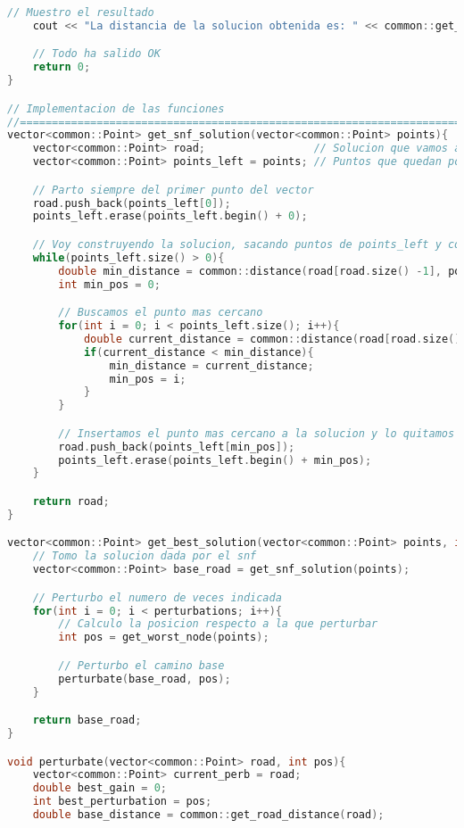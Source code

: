 \documentclass[10pt, a4paper]{article}
\theoremstyle{theorem-style}
\theoremstyle{theorem-style}
\theoremstyle{definition-style}
\theoremstyle{remark-style}
\theoremstyle{example-style}
\theoremstyle{definition-style}
\theoremstyle{remark-style}
\begin{document}
\begin{lstlisting}[language=C]
    // Muestro el resultado
    cout << "La distancia de la solucion obtenida es: " << common::get_road_distance(road) << endl;

    // Todo ha salido OK
    return 0;
}

// Implementacion de las funciones 
//==============================================================================
vector<common::Point> get_snf_solution(vector<common::Point> points){
    vector<common::Point> road;                 // Solucion que vamos a construir
    vector<common::Point> points_left = points; // Puntos que quedan por insertar a la solucion

    // Parto siempre del primer punto del vector
    road.push_back(points_left[0]);
    points_left.erase(points_left.begin() + 0);

    // Voy construyendo la solucion, sacando puntos de points_left y colocandolos en road
    while(points_left.size() > 0){
        double min_distance = common::distance(road[road.size() -1], points_left[0]);
        int min_pos = 0;

        // Buscamos el punto mas cercano
        for(int i = 0; i < points_left.size(); i++){
            double current_distance = common::distance(road[road.size() -1], points_left[i]);
            if(current_distance < min_distance){
                min_distance = current_distance;
                min_pos = i;
            }
        }

        // Insertamos el punto mas cercano a la solucion y lo quitamos de los puntos que faltan
        road.push_back(points_left[min_pos]);
        points_left.erase(points_left.begin() + min_pos);
    }

    return road;
}

vector<common::Point> get_best_solution(vector<common::Point> points, int perturbations){
    // Tomo la solucion dada por el snf
    vector<common::Point> base_road = get_snf_solution(points);

    // Perturbo el numero de veces indicada
    for(int i = 0; i < perturbations; i++){
        // Calculo la posicion respecto a la que perturbar
        int pos = get_worst_node(points);

        // Perturbo el camino base
        perturbate(base_road, pos);
    }

    return base_road;
}

void perturbate(vector<common::Point> road, int pos){
    vector<common::Point> current_perb = road;
    double best_gain = 0;
    int best_perturbation = pos;
    double base_distance = common::get_road_distance(road);
    

\end{lstlisting}
\end{document}
